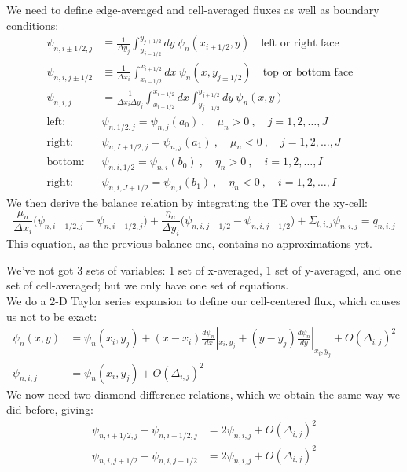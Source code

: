 \documentclass[12pt]{article}
\begin{document}
We need to define edge-averaged and cell-averaged fluxes as well as boundary conditions:
\begin{align*}
\psi_{n,i\pm1/2,j} &\equiv \frac{1}{\Delta y_{j}} \int_{y_{j-1/2}}^{y_{j+1/2}} dy\: \psi_n(x_{i\pm1/2}, y) \quad \text{left or right face}\\
\psi_{n,i,j\pm1/2} &\equiv \frac{1}{\Delta x_{i}} \int_{x_{i-1/2}}^{x_{i+1/2}} dx\: \psi_n(x, y_{j\pm1/2}) \quad \text{top or bottom face}\\
\psi_{n,i,j} &= \frac{1}{\Delta x_i \Delta y_j} \int_{x_{i-1/2}}^{x_{i+1/2}} dx \int_{y_{j-1/2}}^{y_{j+1/2}} dy\: \psi_n(x,y)
&\\
\text{left: }\:&\psi_{n,1/2,j} = \psi_{n,j}(a_0)\:, \quad \mu_n > 0\:, \quad j = 1, 2, \dots, J \\
\text{right: }\:&\psi_{n,I+1/2,j} = \psi_{n,j}(a_1)\:, \quad \mu_n < 0\:, \quad j = 1, 2, \dots, J \\
\text{bottom: }\:&\psi_{n,i,1/2} = \psi_{n,i}(b_0)\:, \quad \eta_n > 0\:, \quad i = 1, 2, \dots, I \\
\text{right: }\:&\psi_{n,i,J+1/2} = \psi_{n,i}(b_1)\:, \quad \eta_n < 0\:, \quad i = 1, 2, \dots, I 
\end{align*}
%
We then derive the balance relation by integrating the TE over the xy-cell:
\[
\frac{\mu_n}{\Delta x_i}\bigl(\psi_{n,i+1/2,j} - \psi_{n,i-1/2,j}\bigr) + \frac{\eta_n}{\Delta y_i}\bigl(\psi_{n,i,j+1/2} - \psi_{n,i,j-1/2}\bigr) + \Sigma_{t,i,j} \psi_{n,i,j} = q_{n,i,j} 
\]
This equation, as the previous balance one, contains no approximations yet. 


We've not got 3 sets of variables: 1 set of x-averaged, 1 set of y-averaged, and one set of cell-averaged; but we only have one set of equations.\\
We do a 2-D Taylor series expansion to define our cell-centered flux, which causes us not to be exact:
\begin{align*}
\psi_n(x,y) &= \psi_n(x_i,y_j) + (x-x_i)\frac{d\psi_n}{dx}|_{x_i,y_j} + (y-y_j)\frac{d\psi_n}{dy}|_{x_i,y_j} + O(\Delta_{i,j})^2\\
\psi_{n,i,j} &= \psi_n(x_i,y_j) + O(\Delta_{i,j})^2
\end{align*}
We now need two diamond-difference relations, which we obtain the same way we did before, giving:
\begin{align*}
\psi_{n,i+1/2,j} + \psi_{n,i-1/2,j} &= 2\psi_{n,i,j} + O(\Delta_{i,j})^2\\
\psi_{n,i,j+1/2} + \psi_{n,i,j-1/2} &= 2\psi_{n,i,j} + O(\Delta_{i,j})^2
\end{align*}
\end{document}
